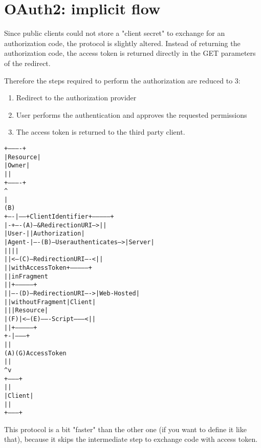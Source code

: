 \section{OAuth2: implicit flow}
Since public clients could not store a "client secret" to exchange for an
authorization code, the protocol is slightly altered.
Instead of returning the authorization code, the access token is returned
directly in the GET parameters of the redirect.

Therefore the steps required to perform the authorization are reduced to 3:
\begin{enumerate}
    \item Redirect to the authorization provider
    \item User performs the authentication and approves the requested
        permissions
    \item The access token is returned to the third party client.
\end{enumerate}

\begin{alltt}
     +----------+
     | Resource |
     |  Owner   |
     |          |
     +----------+
          ^
          |
         (B)
     +----|-----+          Client Identifier     +---------------+
     |         -+----(A)-- & Redirection URI --->|               |
     |  User-   |                                | Authorization |
     |  Agent  -|----(B)-- User authenticates -->|     Server    |
     |          |                                |               |
     |          |<---(C)--- Redirection URI ----<|               |
     |          |          with Access Token     +---------------+
     |          |            in Fragment
     |          |                                +---------------+
     |          |----(D)--- Redirection URI ---->|   Web-Hosted  |
     |          |          without Fragment      |     Client    |
     |          |                                |    Resource   |
     |     (F)  |<---(E)------- Script ---------<|               |
     |          |                                +---------------+
     +-|--------+
       |    |
      (A)  (G) Access Token
       |    |
       ^    v
     +---------+
     |         |
     |  Client |
     |         |
     +---------+
\end{alltt}


This protocol is a bit "faster" than the other one (if you want to define it
like that), because it skips the intermediate step to exchange code with access
token.


